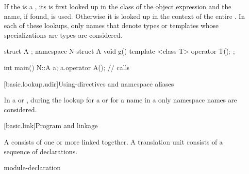\pnum
If the  is a ,
its 
is first looked up
in the class of the object expression
and the name, if
found, is used. Otherwise it is looked up in the context
of the entire .
In each of these lookups, only names that denote types or templates whose
specializations are types are considered.
\begin{example}
\begin{codeblock}
struct A { };
namespace N {
  struct A {
    void g() { }
    template <class T> operator T();
  };
}

int main() {
  N::A a;
  a.operator A();               // calls 
}
\end{codeblock}
\end{example}

[basic.lookup.udir]{Using-directives and namespace aliases}

\pnum
{}%
%
In a  or ,
during the lookup for a  or for a name in a
only namespace names are considered.%
%

[basic.link]{Program and linkage}%

\pnum
{}%
A  consists of one or more 
linked together. A translation unit consists
of a sequence of declarations.

\begin{bnf}
\br
    \br
     module-declaration  
\end{bnf}

